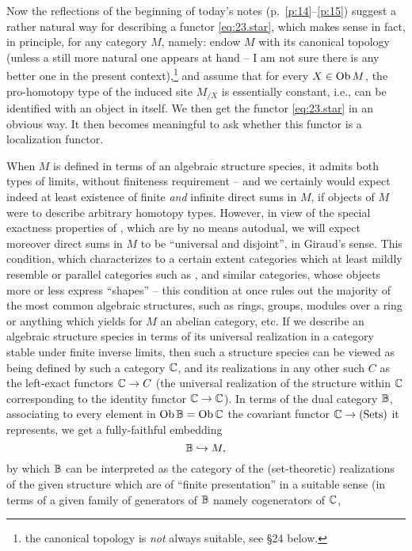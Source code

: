 Now the reflections of the beginning of today's notes
(p.\ \ref{p:14}--\ref{p:15})
suggest a rather natural way for describing a functor
\eqref{eq:23.star}, which makes sense in fact, in principle, for any
category $M$, namely: endow $M$ with its canonical topology (unless a
still more natural one appears at hand -- I am not sure there is any
better one in the present context),\footnote{ the canonical
  topology is \emph{not} always suitable, see \S24 below.} and assume
that for every $X\in\operatorname{Ob} M$, the pro-homotopy type of the induced site
$M_{/X}$ is essentially constant, i.e., can be identified with an
object in \Hot{} itself. We then get the functor \eqref{eq:23.star} in
an obvious way. It then becomes meaningful to ask whether this functor
is a localization functor.

When $M$ is defined in terms of an algebraic structure species,
it admits both types of limits, without finiteness
requirement -- and we certainly would expect indeed at least existence
of finite \emph{and} infinite direct sums in $M$, if objects of $M$
were to describe arbitrary homotopy types. However, in view of the
special exactness properties of \Hot{}, which are by no means autodual,
we will expect moreover direct sums in $M$ to be ``universal and
disjoint'', in Giraud's sense. This condition, which characterizes to
a certain extent categories which at least mildly resemble or parallel
categories such as \Sets, \Spaces{} and similar categories, whose
objects more or less express ``shapes'' -- this condition at once
rules out the majority of the most common algebraic structures, such
as rings, groups, modules over a ring or anything which yields for $M$
an abelian category, etc. If we describe an algebraic structure
species in terms of its universal realization in a category stable
under finite inverse limits, then such a structure species can be
viewed as being defined by such a category ${\mathbb{C}}$, and its
realizations in any other such $C$ as the left-exact functors ${\mathbb{C}}\to C$
(the universal realization of the structure within ${\mathbb{C}}$
corresponding to the identity functor ${\mathbb{C}}\to {\ensuremath{\mathbb{C}}}$). In terms of
the dual category ${\mathbb{B}}$, associating to every element in $\operatorname{Ob}{{\mathbb{B}}}
= \operatorname{Ob}{{\mathbb{C}}}$ the covariant functor ${\mathbb{C}}\to{\ensuremath{(\mathrm{Sets})}}$ it
represents, we get a fully-faithful embedding
\[{\mathbb{B}}\hookrightarrow M,  \]
by which ${\mathbb{B}}$ can be interpreted as the category of the
(set-theoretic) realizations of the given structure which are of
``finite presentation'' in a suitable sense (in terms of a given
family of generators of ${\mathbb{B}}$ namely cogenerators of ${\mathbb{C}}$,
